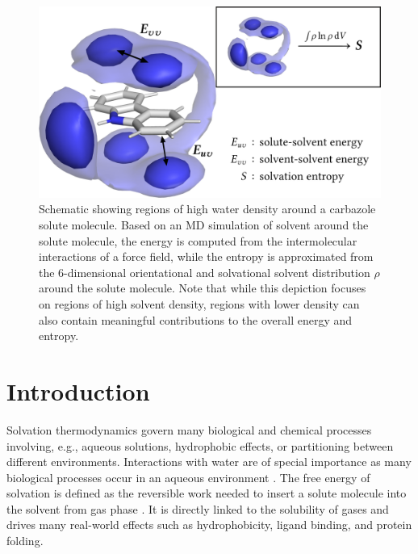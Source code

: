 \documentclass[9pt,tutorial]{livecoms}
\begin{document}
\begin{figure}[H]
	\centering
	\includegraphics[width=\linewidth]{figures/carbazole-figure.png}
	\caption{Schematic showing regions of high water density around a carbazole solute molecule. Based on an MD simulation of solvent around the solute molecule, the energy is computed from the intermolecular interactions of a force field, while the entropy is approximated from the 6-dimensional orientational and solvational solvent distribution $\rho$ around the solute molecule. Note that while this depiction focuses on regions of high solvent density, regions with lower density can also contain meaningful contributions to the overall energy and entropy.}
	\label{fig:carbazole}
\end{figure}
\section{Introduction}
Solvation thermodynamics govern many biological and chemical processes involving, e.g., aqueous solutions, hydrophobic effects, or partitioning between different environments.
Interactions with water are of special importance as many biological processes occur in an aqueous environment \cite{Privalov2017-water-review}.
The free energy of solvation is defined as the reversible work needed to insert a solute molecule into the solvent from gas phase \cite{ben-naim-book}.
It is directly linked to the solubility of gases and drives many real-world effects such as hydrophobicity, ligand binding, and protein folding.
\end{document}
